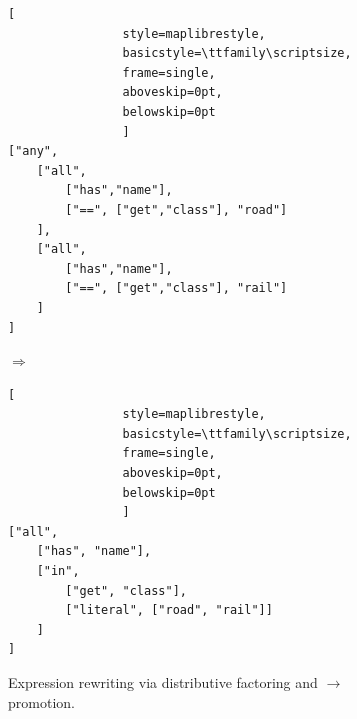 \begin{figure}[ht]
	\centering

	\begin{subfigure}[t]{\linewidth}
		\centering

		\begin{minipage}[c]{0.42\linewidth}
			\centering
			\begin{lstlisting}[
				style=maplibrestyle,
				basicstyle=\ttfamily\scriptsize,
				frame=single,
				aboveskip=0pt,
				belowskip=0pt
				]
["any",
	["all",
		["has","name"],
		["==", ["get","class"], "road"]
	],
	["all",
		["has","name"],
		["==", ["get","class"], "rail"]
	]
]
			\end{lstlisting}
		\end{minipage}
		\hfill
		\begin{minipage}[c]{0.08\linewidth}
			\centering
			\vfill
			{\Huge$\Longrightarrow$}
			\vfill
		\end{minipage}
		\hfill
		\begin{minipage}[c]{0.42\linewidth}
			\centering
			\begin{lstlisting}[
				style=maplibrestyle,
				basicstyle=\ttfamily\scriptsize,
				frame=single,
				aboveskip=0pt,
				belowskip=0pt
				]
["all",
	["has", "name"],
	["in",
		["get", "class"],
		["literal", ["road", "rail"]]
	]
]
			\end{lstlisting}
		\end{minipage}

		\caption{
Expression rewriting via distributive factoring and $\to$ promotion.}
		\label{fig:expr_a}
	\end{subfigure}

	\vspace{4mm}

	\begin{subfigure}[t]{\linewidth}
		\centering


\end{subfigure}
\end{figure}
